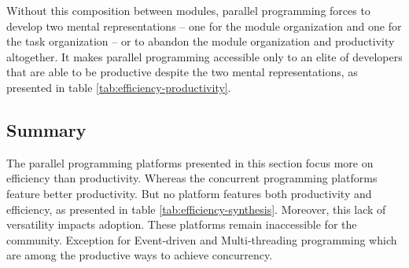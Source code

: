 Without this composition between modules, parallel programming forces to develop two mental representations -- one for the module organization and one for the task organization -- or to abandon the module organization and productivity altogether.
It makes parallel programming accessible only to an elite of developers that are able to be productive despite the two mental representations, as presented in table \ref{tab:efficiency-productivity}.


\subsection{Summary} \label{chapter3:software-efficiency:summary}

The parallel programming platforms presented in this section focus more on efficiency than productivity.
Whereas the concurrent programming platforms feature better productivity.
But no platform features both productivity and efficiency, as presented in table \ref{tab:efficiency-synthesis}.
Moreover, this lack of versatility impacts adoption.
These platforms remain inaccessible for the community.
Exception for Event-driven and Multi-threading programming which are among the productive ways to achieve concurrency.




\endinput

Streaming
\cite{Madsen2015}
\cite{Sun2015}

Map Reduce
\cite{Yao2015}


Web assembly
https://medium.com/javascript-scene/what-is-webassembly-the-dawn-of-a-new-era-61256ec5a8f6
